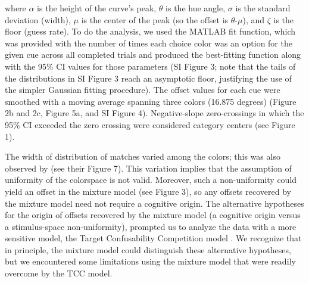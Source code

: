

where $\alpha$ is the height of the curve's peak, $\theta$ is the hue angle, $\sigma$ is the standard deviation (width), $\mu$ is the center of the peak (so the offset is $\theta$-$\mu$), and $\zeta$ is the floor (guess rate). 
To do the analysis, we used the MATLAB fit function, which was provided with the number of times each choice color was an option for the given cue across all completed trials and produced the best-fitting function along with the 95\% CI values for those parameters (SI Figure 3; note that the tails of the distributions in SI Figure 3 reach an asymptotic floor, justifying the use of the simpler Gaussian fitting procedure). 
The offset values for each cue were smoothed with a moving average spanning three colors (16.875 degrees) (Figure 2b and 2c, Figure 5a, and SI Figure 4). Negative-slope zero-crossings in which the 95\% CI exceeded the zero crossing were considered category centers (see Figure 1).

The width of distribution of matches varied among the colors; this was also observed by \citet{bae_why_2015} (see their Figure 7). 
This variation implies that the assumption of uniformity of the colorspace is not valid. 
Moreover, such a non-uniformity could yield an offset in the mixture model (see Figure 3), so any offsets recovered by the mixture model need not require a cognitive origin.  
The alternative hypotheses for the origin of offsets recovered by the mixture model (a cognitive origin versus a stimulus-space non-uniformity), prompted us to analyze the data with a more sensitive model, the Target Confusability Competition model \citep{schurgin_psychophysical_2020}.
We recognize that in principle, the mixture model could distinguish these alternative hypotheses, but we encountered some limitations using the mixture model that were readily overcome by the TCC model. 

